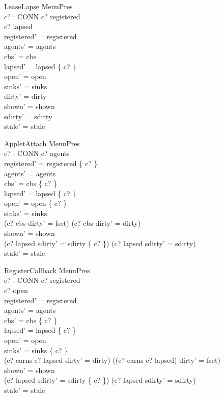 \documentclass[a4paper,10pt,fleqn]{article}
\begin{document}
\begin{schema}{LeaseLapse}
  \Delta MenuPres \\
  c? : CONN
\where
  c? \in registered \\
  c? \notin lapsed \\
  registered' = registered \\
  agents' = agents \\
  cbs' = cbs \\
  lapsed' = lapsed \cup \{ c? \} \\
  open' = open \\
  sinks' = sinks \\
  dirty' = dirty \\
  shown' = shown \\
  sdirty' = sdirty \\
  stale' = stale
\end{schema}

\begin{schema}{AppletAttach}
  \Delta MenuPres \\
  c? : CONN
\where
  c? \notin agents \\
  registered' = registered \cup \{ c? \} \\
  agents' = agents \\
  cbs' = cbs \setminus \{ c? \} \\
  lapsed' = lapsed \setminus \{ c? \} \\
  open' = open \cup \{ c? \} \\
  sinks' = sinks \\
  (c? \in cbs \land dirty' = fset) \lor (c? \notin cbs \land dirty' = dirty) \\
  shown' = shown \\
  (c? \in lapsed \land sdirty' = sdirty \cup \{ c? \}) \lor
    (c? \notin lapsed \land sdirty' = sdirty) \\
  stale' = stale
\end{schema}

\begin{schema}{RegisterCallback}
  \Delta MenuPres \\
  c? : CONN
\where
  c? \in registered \\
  c? \in open \\
  registered' = registered \\
  agents' = agents \\
  cbs' = cbs \cup \{ c? \} \\
  lapsed' = lapsed \setminus \{ c? \} \\
  open' = open \\
  sinks' = sinks \oplus \{ c?  \} \\
  (c? \in earns \land c? \notin lapsed \land dirty' = dirty) \lor
    ((c? \notin earns \lor c? \in lapsed) \land dirty' = fset) \\
  shown' = shown \\
  (c? \in lapsed \land sdirty' = sdirty \cup \{ c? \}) \lor
    (c? \notin lapsed \land sdirty' = sdirty) \\
  stale' = stale
\end{schema}
\end{document}
